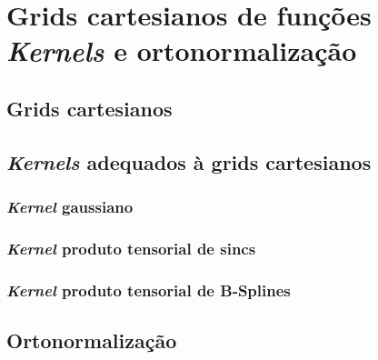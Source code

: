 \chapter{Grids cartesianos de funções \textit{Kernels} e ortonormalização} \label{cap:kernels}

\section{Grids cartesianos}

\section{\textit{Kernels} adequados à grids cartesianos}

\subsection{\textit{Kernel} gaussiano}

\subsection{\textit{Kernel} produto tensorial de sincs}

\subsection{\textit{Kernel} produto tensorial de B-Splines}

\section{Ortonormalização}